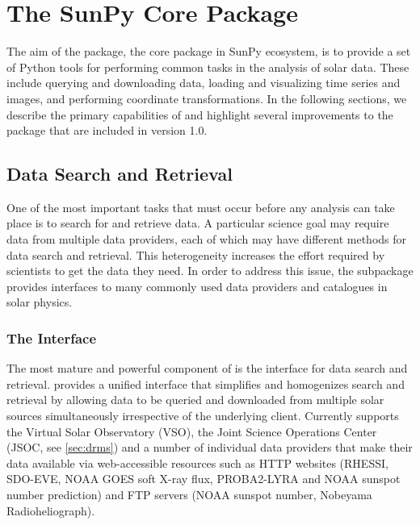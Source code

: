\section{The SunPy Core Package}
\label{sec:sunpycore}

The aim of the \sunpypkg package, the core package in SunPy ecosystem, is to provide a set of Python tools for performing common tasks in the analysis of solar data. These include querying and downloading data, loading and visualizing time series and images, and performing coordinate transformations. In the following sections, we describe the primary capabilities of \sunpypkg and highlight several improvements to the package that are included in version 1.0.

\subsection{Data Search and Retrieval}
\label{sec:fido}

One of the most important tasks that must occur before any analysis can take place is to search for and retrieve data.
A particular science goal may require data from multiple data providers, each of which may have different methods for data search and retrieval.
This heterogeneity increases the effort required by scientists to get the data they need.
In order to address this issue, the  subpackage provides interfaces to many commonly used data providers and catalogues in solar physics.

\subsubsection{The \Fido Interface}
\label{sec:fido}

The most mature and powerful component of  is the \Fido interface for data search and retrieval.
\Fido provides a unified interface that simplifies and homogenizes search and retrieval by allowing data to be queried and downloaded from multiple solar sources simultaneously irrespective of the underlying client.
Currently \Fido supports the Virtual Solar Observatory (VSO), the Joint Science Operations Center (JSOC, see \autoref{sec:drms}) and a number of individual data providers that make their data available via web-accessible resources such as HTTP websites (RHESSI, SDO-EVE, NOAA GOES soft X-ray flux, PROBA2-LYRA and NOAA sunspot number prediction) and FTP servers (NOAA sunspot number, Nobeyama Radioheliograph).

